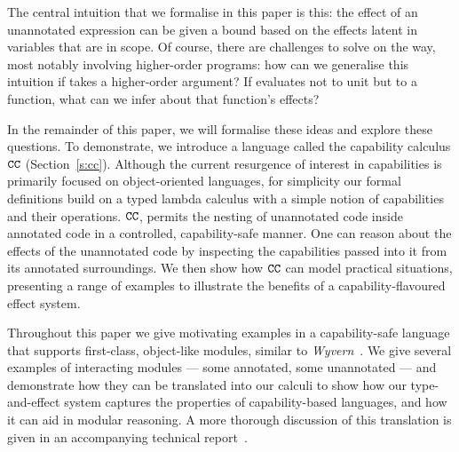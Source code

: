 The central intuition that we formalise in this paper is this: the
effect of an unannotated expression can be given a bound based on the
effects latent in variables that are in scope.  Of course, there are
challenges to solve on the way, most notably involving higher-order
programs: how can we generalise this intuition if  takes a
higher-order argument?  If  evaluates not to unit but to a
function, what can we infer about that function's effects?

In the remainder of this paper, we will formalise these ideas and
explore these questions.  To demonstrate, we introduce a language
called the capability calculus $\mathtt{CC}$ (Section~\ref{s:cc}).
Although the current resurgence of interest in capabilities is
primarily focused on object-oriented languages, for simplicity our
formal definitions build on a typed lambda calculus with a simple
notion of capabilities and their operations. $\mathtt{CC}$, permits the
nesting of unannotated code inside annotated code in a controlled,
capability-safe manner. One can reason about the effects of the
unannotated code by inspecting the capabilities passed into it from
its annotated surroundings.  We then show how $\mathtt{CC}$ can model
practical situations, presenting a range of examples to illustrate the
benefits of a capability-flavoured effect system.


Throughout this paper we give motivating examples in a capability-safe
language %
that supports first-class, object-like modules, similar to
\textit{Wyvern}~\cite{kurilova16}. We give several examples of
interacting modules --- some annotated, some unannotated --- and
demonstrate how they can be translated into our calculi to show how
our type-and-effect system captures the properties of capability-based
languages, and how it can aid in modular reasoning. A more thorough
discussion of this translation is given in an accompanying technical
report~\cite{ecs:2018:aaron-tr}.

